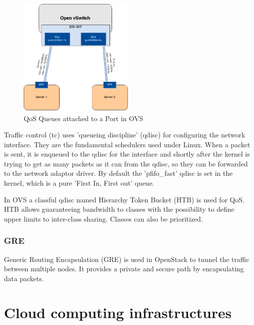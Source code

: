 \begin{figure}[H]
\centering
\includegraphics[width=0.5\textwidth]{images/fundamentals/openvswitch_qos-queues.png}
\caption{QoS Queues attached to a Port in OVS}
\end{figure}


Traffic control (tc) uses 'queueing discipline' (qdisc) for configuring the network interface. They are the fundamental schedulers used under Linux. When a packet is sent, it is enqueued to the qdisc for the interface and shortly after the kernel is trying to get as many packets as it can from the qdisc, so they can be forwarded to the network adaptor driver. By default the 'pfifo\_fast' qdisc is set in the kernel, which is a pure 'First In, First out' queue.

In OVS a classful qdisc named Hierarchy Token Bucket (HTB) is used for QoS. HTB allows guaranteeing bandwidth to classes with the possibility to define upper limits to inter-class sharing. Classes can also be prioritized.


\subsubsection{GRE}
Generic Routing Encapsulation (GRE) is used in OpenStack to tunnel the traffic between multiple nodes. It provides a private and secure path by encapsulating data packets.


\section{Cloud computing infrastructures}


